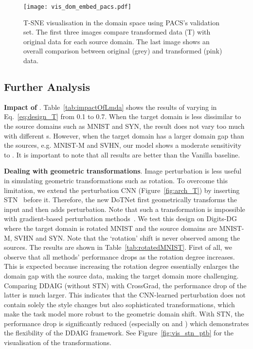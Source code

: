 \documentclass[letterpaper]{article}
\newcommand{\keypoint}[1]{\vspace{0.1cm}\noindent\textbf{#1}}
\begin{document}
\begin{figure*}[t]
\centering
\texttt{[image: vis\_dom\_embed\_pacs.pdf]}
\caption{\small T-SNE visualisation in the domain space using PACS's validation set. The first three images compare transformed data (T) with original data for each source domain. The last image shows an overall comparison between original (grey) and transformed (pink) data.}
\label{fig:vis_dom_embed_pacs}
\vspace{-0.1cm}
\end{figure*}


\subsection{Further Analysis}
\keypoint{Impact of }.
Table~\ref{tab:impactOfLmda} shows the results of varying  in Eq.~\ref{eq:design_T} from 0.1 to 0.7. When the target domain is less dissimilar to the source domains such as MNIST and SYN, the result does not vary too much with different s. However, when the target domain has a larger domain gap than the sources, e.g. MNIST-M and SVHN, our model shows a moderate sensitivity to . It is important to note that all results are better than the Vanilla baseline.

\keypoint{Dealing with geometric transformations}.
Image perturbation is less useful in simulating geometric transformations such as rotation. To overcome this limitation, we extend the perturbation CNN (Figure~\ref{fig:arch_T}) by inserting STN~\cite{nips15stn} before it. Therefore, the new DoTNet first geometrically transforms the input and then adds perturbation. Note that such a transformation is  impossible with gradient-based perturbation methods~\cite{shankar2018generalizing}.
We test this design on Digits-DG where the target domain is rotated MNIST and the source domains are MNIST-M, SVHN and SYN. Note that the `rotation' shift is never observed among the sources.
The results are shown in Table~\ref{tab:rotatedMNIST}. First of all, we observe that all methods' performance drops as the rotation degree increases. This is expected because increasing the rotation degree essentially enlarges the domain gap with the source data, making the target domain more challenging.
Comparing DDAIG (without STN) with CrossGrad, the performance drop of the latter is much larger. This indicates that the CNN-learned perturbation does not contain solely the style changes but also sophisticated transformations, which make the task model more robust to the geometric domain shift.
With STN, the performance drop is significantly reduced (especially on  and ) which demonstrates the flexibility of the DDAIG framework.
See Figure~\ref{fig:vis_stn_ptb} for the visualisation of the transformations.
\end{document}

